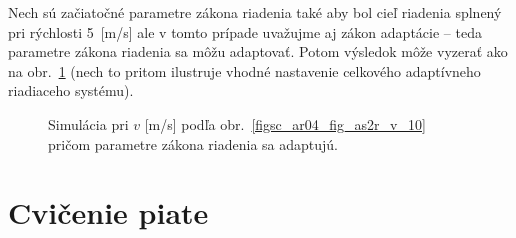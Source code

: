 \documentclass[a4paper, 10pt, ]{article}
\begin{document}
Nech sú začiatočné parametre zákona riadenia také aby bol cieľ riadenia splnený pri rýchlosti 5~[m/s] ale v tomto prípade uvažujme aj zákon adaptácie -- teda parametre zákona riadenia sa môžu adaptovať. Potom výsledok môže vyzerať ako na obr.~\ref{figsc_ar04_fig_as2r_yu_89} (nech to pritom ilustruje vhodné nastavenie celkového adaptívneho riadiaceho systému).



\begin{figure}[t]
	\centering



	\caption{Simulácia pri $v$ [m/s] podľa obr.~\ref{figsc_ar04_fig_as2r_v_10} pričom parametre zákona riadenia sa adaptujú.}
	\label{figsc_ar04_fig_as2r_yu_89}

\end{figure}























\section{Cvičenie piate}
\label{cvictretie}
\end{document}
